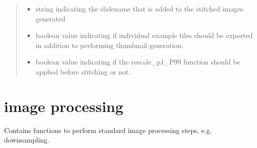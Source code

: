\documentclass[a4paper,10pt,english,openany,oneside]{sphinxmanual}
\begin{document}
\begin{fulllineitems}
\begin{quote}
\begin{description}
\begin{itemize}
\item {} 
\sphinxAtStartPar
{} \textendash{} string indicating the slidename that is added to the stitched images generated

\item {} 
\sphinxAtStartPar
{} \textendash{} boolean value indicating if individual example tiles should be exported in addition to performing thumbnail generation.

\item {} 
\sphinxAtStartPar
{} \textendash{} boolean value indicating if the rescale\_p1\_P99 function should be applied before stitching or not.

\end{itemize}

\end{description}\end{quote}

\end{fulllineitems}

\label{\detokenize{pages/modules:module-sparcstools.image_processing}}

\section{image processing}
\label{\detokenize{pages/modules:image-processing}}
\sphinxAtStartPar
Contains functions to perform standard image processing steps, e.g. downsampling.
\end{document}
